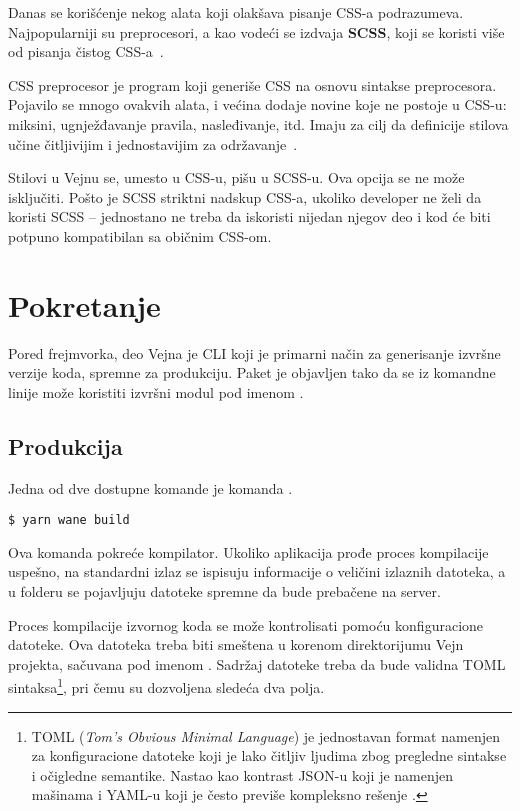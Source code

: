 Danas se korišćenje nekog alata koji olakšava pisanje CSS-a podrazumeva.
Najpopularniji su preprocesori, a kao vodeći se izdvaja \textbf{SCSS}, koji se koristi više od pisanja čistog CSS-a~\cite{sojs:2017}.

CSS preprocesor je program koji generiše CSS na osnovu sintakse preprocesora.
Pojavilo se mnogo ovakvih alata, i većina dodaje novine koje ne postoje u CSS-u: miksini, ugnježđavanje pravila, nasleđivanje, itd.
Imaju za cilj da definicije stilova učine čitljivijim i jednostavijim za održavanje~\cite{mdn:glossary:css-preprocessor}.

Stilovi u Vejnu se, umesto u CSS-u, pišu u SCSS-u.
Ova opcija se ne može isključiti.
Pošto je SCSS striktni nadskup CSS-a, ukoliko developer ne želi da koristi SCSS -- jednostano ne treba da iskoristi nijedan njegov deo i kod će biti potpuno kompatibilan sa običnim CSS-om.

\section{Pokretanje}

Pored frejmvorka, deo Vejna je CLI koji je primarni način za generisanje izvršne verzije koda, spremne za produkciju.
Paket je objavljen tako da se iz komandne linije može koristiti izvršni modul pod imenom .

\subsection{Produkcija}

Jedna od dve dostupne komande je komanda .

\begin{verbatim}
$ yarn wane build
\end{verbatim}

Ova komanda pokreće kompilator.
Ukoliko aplikacija prođe proces kompilacije uspešno, na standardni izlaz se ispisuju informacije o veličini izlaznih datoteka, a u  folderu se pojavljuju datoteke spremne da bude prebačene na server.

Proces kompilacije izvornog koda se može kontrolisati pomoću konfiguracione datoteke.
Ova datoteka treba biti smeštena u korenom direktorijumu Vejn projekta, sačuvana pod imenom .
Sadržaj datoteke treba da bude validna TOML sintaksa\footnote{TOML (\textsl{Tom's Obvious Minimal Language}) je jednostavan format namenjen za konfiguracione datoteke koji je lako čitljiv ljudima zbog pregledne sintakse i očigledne semantike. Nastao kao kontrast JSON-u koji je namenjen mašinama i YAML-u koji je često previše kompleksno rešenje \cite{toml:spec}.}, pri čemu su dozvoljena sledeća dva polja.

